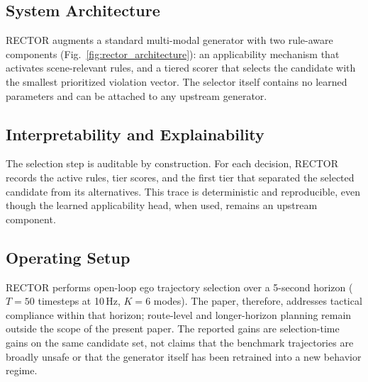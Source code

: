 \subsection{System Architecture}
\label{subsec:architecture}

RECTOR augments a standard multi-modal generator with two rule-aware components (Fig.~\ref{fig:rector_architecture}): an applicability mechanism that activates scene-relevant rules, and a tiered scorer that selects the candidate with the smallest prioritized violation vector. The selector itself contains no learned parameters and can be attached to any upstream generator.

\subsection{Interpretability and Explainability}
\label{subsec:interpretability}

The selection step is auditable by construction. For each decision, RECTOR records the active rules, tier scores, and the first tier that separated the selected candidate from its alternatives. This trace is deterministic and reproducible, even though the learned applicability head, when used, remains an upstream component.

\subsection{Operating Setup}
\label{subsec:scope}

\textsc{RECTOR} performs open-loop ego trajectory selection over a 5-second horizon ($T{=}50$ timesteps at 10\,Hz, $K{=}6$ modes). The paper, therefore, addresses tactical compliance within that horizon; route-level and longer-horizon planning remain outside the scope of the present paper. The reported gains are selection-time gains on the same candidate set, not claims that the benchmark trajectories are broadly unsafe or that the generator itself has been retrained into a new behavior regime.

